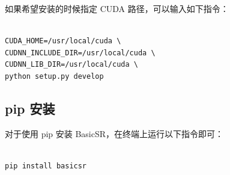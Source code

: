 \documentclass[../main.tex]{subfiles}
\begin{document}
如果希望安装的时候指定 CUDA 路径，可以输入如下指令：

\begin{verbatim}

CUDA_HOME=/usr/local/cuda \
CUDNN_INCLUDE_DIR=/usr/local/cuda \
CUDNN_LIB_DIR=/usr/local/cuda \
python setup.py develop

\end{verbatim}

\subsection{pip 安装}
\label{subsection:pip-install}
对于使用 pip 安装 BasicSR，在终端上运行以下指令即可：
    \begin{verbatim}

pip install basicsr

    \end{verbatim}












\end{document}
